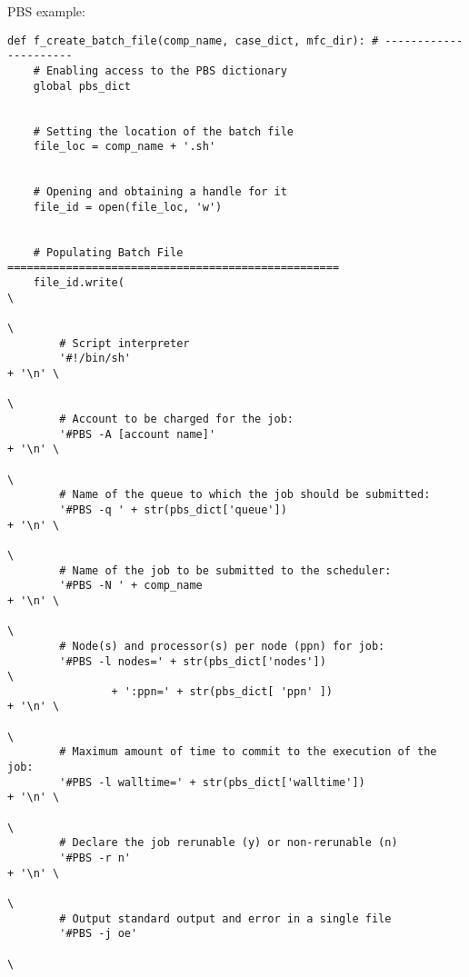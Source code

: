 \documentclass[11pt]{article}
\begin{document}
PBS example: \\
\begin{lstlisting}[style=BashInputStyle]
def f_create_batch_file(comp_name, case_dict, mfc_dir): # ----------------------
    # Enabling access to the PBS dictionary
    global pbs_dict
    
    
    # Setting the location of the batch file
    file_loc = comp_name + '.sh'
    
    
    # Opening and obtaining a handle for it
    file_id = open(file_loc, 'w')
    
    
    # Populating Batch File  ===================================================
    file_id.write(                                                             \
                                                                               \
        # Script interpreter
        '#!/bin/sh'                                                     + '\n' \
                                                                               \
        # Account to be charged for the job:
        '#PBS -A [account name]'                                          + '\n' \
                                                                               \
        # Name of the queue to which the job should be submitted:
        '#PBS -q ' + str(pbs_dict['queue'])                             + '\n' \
                                                                               \
        # Name of the job to be submitted to the scheduler:
        '#PBS -N ' + comp_name                                          + '\n' \
                                                                               \
        # Node(s) and processor(s) per node (ppn) for job:
        '#PBS -l nodes=' + str(pbs_dict['nodes'])                              \
                + ':ppn=' + str(pbs_dict[ 'ppn' ])                       + '\n' \
                                                                               \
        # Maximum amount of time to commit to the execution of the job:
        '#PBS -l walltime=' + str(pbs_dict['walltime'])                 + '\n' \
                                                                               \
        # Declare the job rerunable (y) or non-rerunable (n)
        '#PBS -r n'                                                     + '\n' \
                                                                               \
        # Output standard output and error in a single file
        '#PBS -j oe'
                                                                               \

\end{lstlisting}
\end{document}
